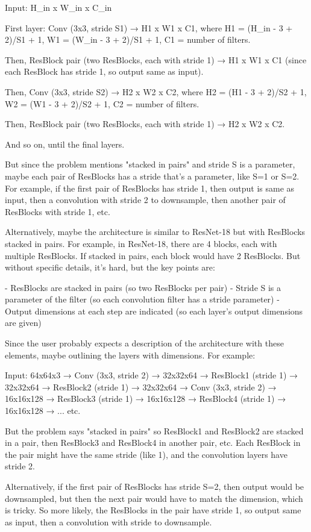 Input: H_in x W_in x C_in

First layer: Conv (3x3, stride S1) → H1 x W1 x C1, where H1 = (H_in - 3 + 2)/S1 + 1, W1 = (W_in - 3 + 2)/S1 + 1, C1 = number of filters.

Then, ResBlock pair (two ResBlocks, each with stride 1) → H1 x W1 x C1 (since each ResBlock has stride 1, so output same as input).

Then, Conv (3x3, stride S2) → H2 x W2 x C2, where H2 = (H1 - 3 + 2)/S2 + 1, W2 = (W1 - 3 + 2)/S2 + 1, C2 = number of filters.

Then, ResBlock pair (two ResBlocks, each with stride 1) → H2 x W2 x C2.

And so on, until the final layers.

But since the problem mentions "stacked in pairs" and stride S is a parameter, maybe each pair of ResBlocks has a stride that's a parameter, like S=1 or S=2. For example, if the first pair of ResBlocks has stride 1, then output is same as input, then a convolution with stride 2 to downsample, then another pair of ResBlocks with stride 1, etc.

Alternatively, maybe the architecture is similar to ResNet-18 but with ResBlocks stacked in pairs. For example, in ResNet-18, there are 4 blocks, each with multiple ResBlocks. If stacked in pairs, each block would have 2 ResBlocks. But without specific details, it's hard, but the key points are:

- ResBlocks are stacked in pairs (so two ResBlocks per pair)
- Stride S is a parameter of the filter (so each convolution filter has a stride parameter)
- Output dimensions at each step are indicated (so each layer's output dimensions are given)

Since the user probably expects a description of the architecture with these elements, maybe outlining the layers with dimensions. For example:

Input: 64x64x3 → Conv (3x3, stride 2) → 32x32x64 → ResBlock1 (stride 1) → 32x32x64 → ResBlock2 (stride 1) → 32x32x64 → Conv (3x3, stride 2) → 16x16x128 → ResBlock3 (stride 1) → 16x16x128 → ResBlock4 (stride 1) → 16x16x128 → ... etc.

But the problem says "stacked in pairs" so ResBlock1 and ResBlock2 are stacked in a pair, then ResBlock3 and ResBlock4 in another pair, etc. Each ResBlock in the pair might have the same stride (like 1), and the convolution layers have stride 2.

Alternatively, if the first pair of ResBlocks has stride S=2, then output would be downsampled, but then the next pair would have to match the dimension, which is tricky. So more likely, the ResBlocks in the pair have stride 1, so output same as input, then a convolution with stride to downsample.


